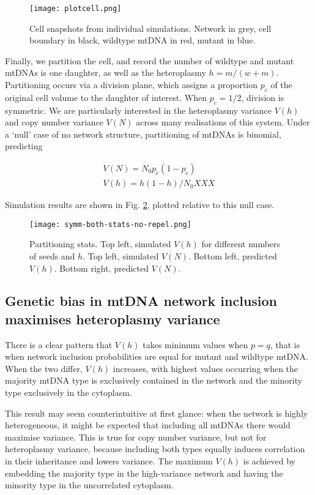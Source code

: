 \documentclass{article}
\begin{document}
\begin{figure}
  \texttt{[image: plotcell.png]}
  \caption{Cell snapshots from individual simulations. Network in grey, cell boundary in black, wildtype mtDNA in red, mutant in blue.}
  \label{fig-snaps}
\end{figure}

Finally, we partition the cell, and record the number of wildtype and mutant mtDNAs is one daughter, as well as the heteroplasmy $h = m/(w+m)$. Partitioning occurs via a division plane, which assigns a proportion $p_c$ of the original cell volume to the daughter of interest. When $p_c = 1/2$, division is symmetric. We are particularly interested in the heteroplasmy variance $V(h)$ and copy number variance $V(N)$ across many realisations of this system. Under a `null' case of no network structure, partitioning of mtDNAs is binomial, predicting 

\begin{eqnarray*} 
V(N) = N_0 p_c(1-p_c) \\
V(h) = h(1-h) / N_0 XXX
\end{eqnarray*}

Simulation results are shown in Fig. \ref{fig1a}, plotted relative to this null case. 

\begin{figure}
  \texttt{[image: symm-both-stats-no-repel.png]}
  \caption{Partitioning stats. Top left, simulated $V(h)$ for different numbers of seeds and $h$. Top left, simulated $V(N)$. Bottom left, predicted $V(h)$. Bottom right, predicted $V(N)$.}
  \label{fig1a}
\end{figure}

\subsection*{Genetic bias in mtDNA network inclusion maximises heteroplasmy variance} 
There is a clear pattern that $V(h)$ takes minimum values when $p=q$, that is when network inclusion probabilities are equal for mutant and wildtype mtDNA. When the two differ, $V(h)$ increases, with highest values occurring when the majority mtDNA type is exclusively contained in the network and the minority type exclusively in the cytoplasm. 

This result may seem counterintuitive at first glance: when the network is highly heterogeneous, it might be expected that including all mtDNAs there would maximise variance. This is true for copy number variance, but not for heteroplasmy variance, because including both types equally induces correlation in their inheritance and lowers variance. The maximum $V(h)$ is achieved by embedding the majority type in the high-variance network and having the minority type in the uncorrelated cytoplasm. 
\end{document}

